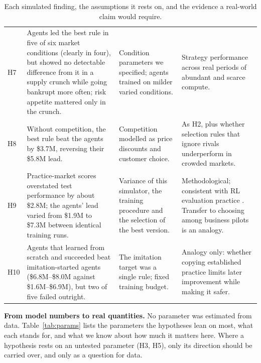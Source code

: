 \documentclass[11pt]{article}
\begin{document}
\begin{table}[!htbp]
\begin{tabularx}{\linewidth}{>{\raggedright\arraybackslash}p{0.4cm}LLL}
H7 & Agents led the best rule in five of six market conditions (clearly in four), but showed no detectable difference from it in a supply crunch while going bankrupt more often; risk appetite mattered only in the crunch. & Condition parameters we specified; agents trained on milder varied conditions. & Strategy performance across real periods of abundant and scarce compute. \\
H8 & Without competition, the best rule beat the agents by \$3.7M, reversing their \$5.8M lead. & Competition modelled as price discounts and customer choice. & As H2, plus whether selection rules that ignore rivals underperform in crowded markets. \\
H9 & Practice-market scores overstated test performance by about \$2.8M; the agents' lead varied from \$1.9M to \$7.3M between identical training runs. & Variance of this simulator, the training procedure and the selection of the best version. & Methodological; consistent with RL evaluation practice \citep{henderson2018matters,agarwal2021precipice}. Transfer to choosing among business pilots is an analogy. \\
H10 & Agents that learned from scratch and succeeded beat imitation-started agents (\$6.8M--\$8.0M against \$1.6M--\$6.9M), but two of five failed outright. & The imitation target was a single rule; fixed training budget. & Analogy only: whether copying established practice limits later improvement while making it safer. \\
\bottomrule
\end{tabularx}
\caption{Each simulated finding, the assumptions it rests on, and the evidence a real-world claim would require.}
\label{tab:hypotheses}
\end{table}

\textbf{From model numbers to real quantities.} No parameter was estimated from data. Table~\ref{tab:params} lists the parameters the hypotheses lean on most, what each stands for, and what we know about how much it matters here. Where a hypothesis rests on an untested parameter (H3, H5), only its direction should be carried over, and only as a question for data.
\end{document}
